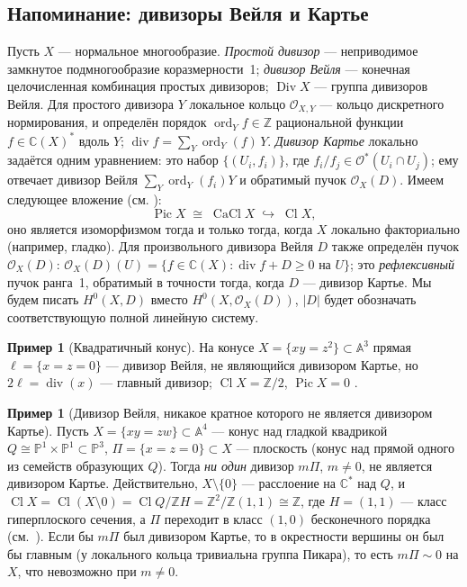 \documentclass[11pt,a4paper]{article}
\theoremstyle{plain}
\theoremstyle{definition}
\newtheorem{example}[theorem]{Пример}
\theoremstyle{remark}
\renewcommand{\C}{\mathbb{C}}
\newcommand{\Z}{\mathbb{Z}}
\newcommand{\PP}{\mathbb{P}}
\newcommand{\A}{\mathbb{A}}
\newcommand{\cO}{\mathcal{O}}
\DeclareMathOperator{\Pic}{Pic}
\DeclareMathOperator{\Cl}{Cl}
\DeclareMathOperator{\CaCl}{CaCl}
\DeclareMathOperator{\Div}{Div}
\DeclareMathOperator{\divv}{div}
\DeclareMathOperator{\ord}{ord}
\begin{document}
\subsection{Напоминание: дивизоры Вейля и Картье}

Пусть $X$ --- нормальное многообразие. \emph{Простой дивизор} --- неприводимое замкнутое
подмногообразие коразмерности~1; \emph{дивизор Вейля} --- конечная целочисленная комбинация
простых дивизоров; $\Div X$ --- группа дивизоров Вейля. Для простого дивизора $Y$ локальное кольцо
$\cO_{X,Y}$ --- кольцо дискретного нормирования, и определён порядок
$\ord_Y f\in\Z$ рациональной функции $f\in\C(X)^*$ вдоль $Y$; $\divv f=\sum_Y\ord_Y(f)\,Y$.
\emph{Дивизор Картье} локально задаётся одним уравнением: это набор $\{(U_i,f_i)\}$, где
$f_i/f_j\in\cO^*(U_i\cap U_j)$; ему отвечает дивизор Вейля $\sum_Y\ord_Y(f_i)Y$ и обратимый пучок
$\cO_X(D)$. Имеем следующее вложение (см. \cite[II.6]{Ha}):
\[
\Pic X\;\cong\;\CaCl X\;\hookrightarrow\;\Cl X,
\]
оно является изоморфизмом тогда и только тогда, когда $X$ локально факториально
(например, гладко). Для произвольного дивизора Вейля $D$ также определён пучок
$\cO_X(D)$: $\cO_X(D)(U)=\{f\in\C(X):\divv f+D\ge0\text{ на }U\}$; это \emph{рефлексивный} пучок
ранга~1, обратимый в точности тогда, когда $D$ --- дивизор Картье. Мы будем писать $H^0(X,D)$
вместо $H^0(X,\cO_X(D))$, $|D|$ будет обозначать соответствующую полной линейную систему.

\begin{example}[Квадратичный конус]\label{ex:cone-divisors}
На конусе $X=\{xy=z^2\}\subset\A^3$ прямая $\ell=\{x=z=0\}$ --- дивизор Вейля, не являющийся
дивизором Картье, но $2\ell=\divv(x)$ --- главный дивизор; $\Cl X=\Z/2$, $\Pic X=0$
\cite[II.6.5.2]{Ha}.
\end{example}

\begin{example}[Дивизор Вейля, никакое кратное которого не является дивизором Картье]\label{ex:nonQCartier}
Пусть $X=\{xy=zw\}\subset\A^4$ --- конус над гладкой квадрикой $Q\cong\PP^1\times\PP^1\subset\PP^3$,
$\Pi=\{x=z=0\}\subset X$ --- плоскость (конус над прямой одного из семейств образующих $Q$).
Тогда \emph{ни один} дивизор $m\Pi$, $m\ne0$, не является дивизором Картье. Действительно,
$X\setminus\{0\}$ --- расслоение на $\C^*$ над $Q$, и $\Cl X=\Cl(X\setminus0)=\Cl Q/\Z H=
\Z^2/\Z(1,1)\cong\Z$, где $H=(1,1)$ --- класс гиперплоского сечения, а $\Pi$ переходит в класс
$(1,0)$ бесконечного порядка (см.~\cite[II, упр.~6.3]{Ha}). Если бы $m\Pi$ был дивизором Картье,
то в окрестности вершины он был бы главным (у локального кольца тривиальна группа Пикара), то
есть $m\Pi\sim0$ на $X$, что невозможно при $m\ne0$.
\end{example}
\end{document}
